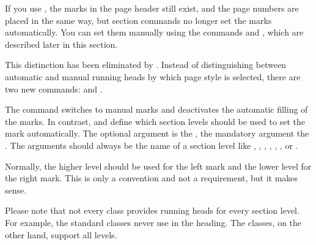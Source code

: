 {\begin{Explain}
      If you use %
      , the marks in the page header still exist, and the page
      numbers are placed in the same way, but section commands no longer set
      the marks automatically. You can set them manually using the commands
       and
      , which are described later
      in this section.
    \end{Explain}\par
  }{%
  }%
  This distinction has been eliminated by %
  \iffalse \Package{scrpage2} and now also by \fi%
  \hyperref[cha:scrlayer]{}. Instead
  of distinguishing between automatic and manual running heads by which page style is selected, there are
  two new commands:  and .

  The  command switches to
  manual marks and deactivates the automatic filling of the marks. In contrast,
   and  define
  which section levels should be used to set the mark automatically. The
  optional argument is the , the
  mandatory argument the . The
  arguments should always be the name of a section level like
  , , , ,
  , , or .

  Normally, the higher level should be used for the left mark and the lower
  level for the right mark. This is only a convention and not a requirement,
  but it makes sense.

  Please note that not every class provides running heads
  for every section level. For example, the standard classes never use 
  in the heading. The \KOMAScript{} classes, on the other hand, support all
  levels.

